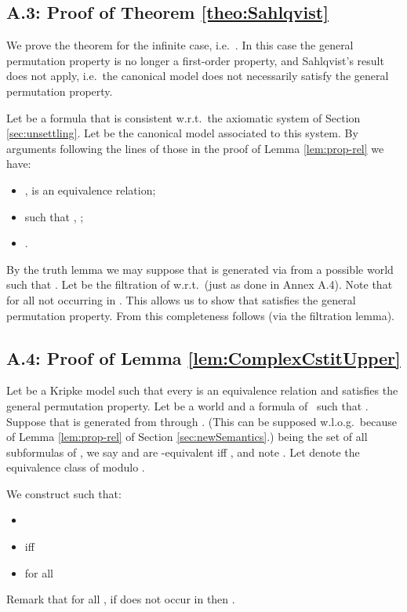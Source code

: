 \documentclass{article}
\newcommand{\LCSTIT}{}
\begin{document}
\subsection*{A.3: Proof of Theorem \ref{theo:Sahlqvist}}

We prove the theorem for the infinite case, i.e.\ .
In this case the general permutation property is no longer a first-order property,
and Sahlqvist's result does not apply, i.e.\ the canonical model does not
necessarily satisfy the general permutation property.

Let  be a formula that is consistent w.r.t.\ the axiomatic system
of Section \ref{sec:unsettling}.
Let  be the canonical model associated to this system.
By arguments following the lines of those in the proof of Lemma \ref{lem:prop-rel} we have:
\begin{itemize}
\item ,  is an equivalence relation;
\item  such that , ;
\item .
\end{itemize}
By the truth lemma we may suppose that  is generated via 
from a possible world  such that .
Let  be the filtration of  w.r.t.\ 
(just as done in Annex A.4).
Note that  for all  not occurring in .
This allows us to show that  satisfies the general permutation property.
From this completeness follows (via the filtration lemma).




\subsection*{A.4: Proof of Lemma \ref{lem:ComplexCstitUpper}}

Let   be a Kripke model such that
every  is an equivalence relation and
 satisfies the general permutation property.
Let  be a world and  a formula of \LCSTIT\ such that
.
Suppose that  is generated from  through .
(This can be supposed w.l.o.g.\ because of Lemma \ref{lem:prop-rel}
of Section \ref{sec:newSemantics}.)
 being the set of all subformulas of ,
we say  and  are -equivalent iff
, and note .
Let  denote
the equivalence class of  modulo .

We construct  such that:
\begin{itemize}
\item 
\item         iff
      
\item  for all 
\end{itemize}
Remark that for all ,
if  does not occur in  then .
\end{document}
